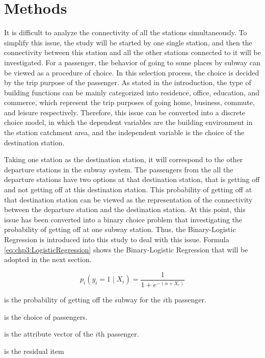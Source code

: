 %
\section{Methods}
%
It is difficult to analyze the connectivity of all the stations simultaneously. To simplify this issue, the study will be started by one single station, and then the connectivity between this station and all the other stations connected to it will be investigated. For a passenger, the behavior of going to some places by subway can be viewed as a procedure of choice. In this selection process, the choice is decided by the trip purpose of the passenger. As stated in the introduction, the type of building functions can be mainly categorized into residence, office, education, and commerce, which represent the trip purposes of going home, business, commute, and leisure respectively. Therefore, this issue can be converted into a discrete choice model, in which the dependent variables are the building environment in the station catchment area, and the independent variable is the choice of the destination station.

%
Taking one station as the destination station, it will correspond to the other departure stations in the subway system. The passengers from the all the departure stations have two options at that destination station, that is getting off and not getting off at this destination station. This probability of getting off at that destination station can be viewed as the representation of the connectivity between the departure station and the destination station. At this point, this issue has been converted into a binary choice problem that investigating the probability of getting off at one subway station. Thus, the Binary-Logistic Regression is introduced into this study to deal with this issue. Formula \ref{eq:chp3:LogisticRegression} shows the Binary-Logistic Regression that will be adopted in the next section.

\begin{equation}
	p_i(y_i=1 \mid X_i)=\frac{1}{1+e^{-(\alpha +X_i)}}
	\label{eq:chp3:LogisticRegression}
\end{equation}

\begin{description}
	\normalsize
	\item[\textbf{Where:}]
	\item[$p_i$] is the probability of getting off the subway for the $i$th passenger.
	\item[$y$] is the choice of passengers.
	\item[$X_i$] is the attribute vector of the $i$th passenger.
	\item[$\alpha$] is the residual item
\end{description}

